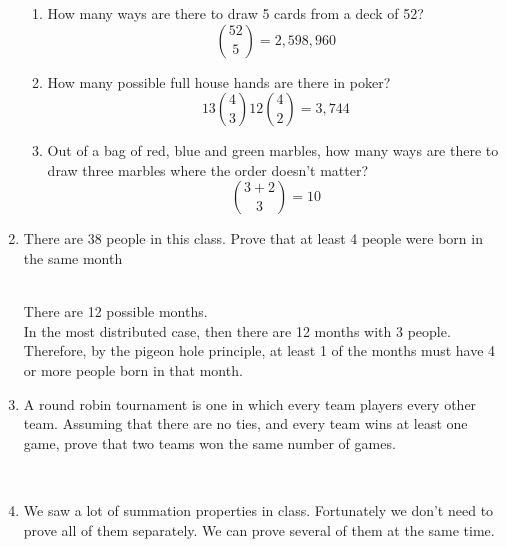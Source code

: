 \documentclass[basic, header]{nosvagor-notes}
\begin{document}
\begin{enumerate}
\begin{enumerate}
      \item How many ways are there to draw 5 cards from a deck of 52?
        \[%
          {52 \choose 5} = 2,598,960
        \]%

      \item How many possible full house hands are there in poker?
        \[%
          13{4 \choose 3}12{4 \choose 2} = 3,744
        \]%

      \item Out of a bag of red, blue and green marbles, how many ways are
        there to draw three marbles where the order doesn't matter?
        \[%
          {3+2 \choose 3}  = 10
        \]%

    \end{enumerate}

  \newpage %

  \item There are 38 people in this class. Prove that at least 4 people were
    born in the same month

    \\
    There are 12 possible months.\\
    In the most distributed case, then there are 12 months with 3 people.\\
    Therefore, by the pigeon hole principle, at least 1 of the months must have
    4 or more people born in that month.\tqed

  \item A round robin tournament is one in which every team players every
    other team. Assuming that there are no ties, and every team wins at least
    one game, prove that two teams won the same number of games.


    \\


  \item We saw a lot of summation properties in class. Fortunately we don’t
    need to prove all of them separately. We can prove several of them at the
    same time.


\end{enumerate}
\end{document}
